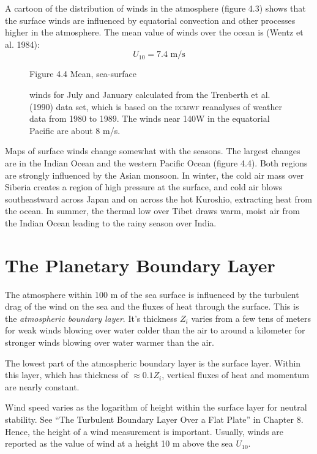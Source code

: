 A cartoon of the distribution of winds in the atmosphere (figure 4.3)
shows that the surface winds are influenced by equatorial convection
and other processes higher in the atmosphere. The mean value
of winds over the ocean is (Wentz et al. 1984):
\begin{equation}
U_{10} = 7.4 \text{ m/s}
\end{equation}

\begin{figure}[b!]
\vspace{-1ex}
{}
\footnotesize
Figure 4.4 Mean, sea-surface \rule{0pt}{3ex}winds for July and January
calculated from the Trenberth et al. (1990) data set, which is based
on the \textsc{ecmwf} reanalyses of weather data from 1980 to
1989. The winds near 140\degrees W in the equatorial Pacific are about 8 m/s.
\label{fig:seasonalwinds}
\end{figure}

Maps of surface winds change somewhat with the seasons. The largest
changes are in the Indian Ocean and the western Pacific Ocean (figure
4.4). Both regions are strongly influenced by the Asian monsoon. In
winter, the cold air mass over Siberia creates a region of high
pressure at the surface, and cold air blows southeastward across Japan
and on across the hot Kuroshio, extracting heat from
the ocean. In summer, the thermal low over Tibet draws warm, moist air
from the Indian Ocean leading to the rainy season over India.

\section{The Planetary Boundary Layer}
The atmosphere within 100 m of the sea surface is influenced by the
turbulent drag of the wind on the sea and the fluxes of heat through
the surface. This is the \textit{atmospheric boundary
  layer}. It's thickness
$Z_i$ varies from a few tens of meters for weak winds blowing over
water colder than the air to around a kilometer for stronger winds
blowing over water warmer than the air.

The lowest part of the atmospheric boundary layer is the surface
layer. Within this layer, which has thickness of $\approx 0.1 Z_i$,
vertical fluxes of heat and momentum are nearly constant.

Wind speed varies as the logarithm of height within the surface layer
for neutral stability. See ``The Turbulent Boundary Layer Over a Flat
Plate'' in Chapter 8. Hence, the height of a wind measurement is
important. Usually, winds are reported as the value of wind at a
height 10 m above the sea $U_{10}$.

